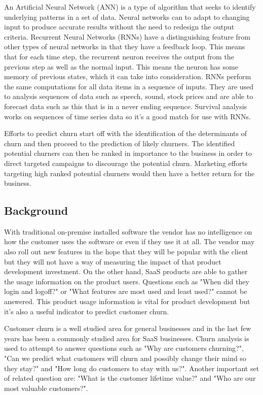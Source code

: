\documentclass[final,a4paper,peerreviewca]{IEEEtran}
\begin{document}
An Artificial Neural Network (ANN) is a type of algorithm that seeks to identify underlying patterns in a set of data. Neural networks can to adapt to changing input to produce accurate results without the need to redesign the output criteria. Recurrent Neural Networks (RNNs) have a distinguishing feature from other types of neural networks in that they have a feedback loop. This means that for each time step, the recurrent neuron receives the output from the previous step as well as the normal input. This means the neuron has some memory of previous states, which it can take into consideration. RNNs perform the same computations for all data items in a sequence of inputs. They are used to analysis sequences of data such as speech, sound, stock prices and are able to forecast data such as this that is in a never ending sequence. Survival analysis works on sequences of time series data so it's a good match for use with RNNs.

Efforts to predict churn start off with the identification of the determinants of churn and then proceed to the prediction of likely churners. The identified potential churners can then be ranked in importance to the business in order to direct targeted campaigns to discourage the potential churn. Marketing efforts targeting high ranked potential churners would then have a better return for the business.

\subsection{Background}
With traditional on-premise installed software the vendor has no intelligence on how the customer uses the software or even if they use it at all. The vendor may also roll out new features in the hope that they will be popular with the client but they will not have a way of measuring the impact of that product development investment. On the other hand, SaaS products are able to gather the usage information on the product users. Questions such as "When did they login and logoff?" or "What features are most used and least used?" cannot be answered. This product usage information is vital for product development but it's also a useful indicator to predict customer churn.

Customer churn is a well studied area for general businesses and in the last few years has been a commonly studied area for SaaS businesses. Churn analysis is used to attempt to answer questions such as "Why are customers churning?", "Can we predict what customers will churn and possibly change their mind so they stay?" and "How long do customers to stay with us?". Another important set of related question are: "What is the customer lifetime value?" and "Who are our most valuable customers?". 
\end{document}
